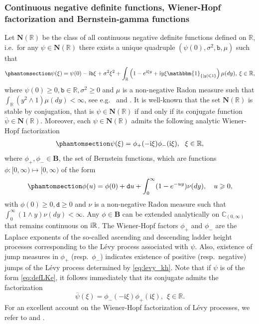 \documentclass[12pt]{amsart}
\newcommand{\hlabel}{\phantomsection\label}
\numberwithin{equation}{section}
\newcommand{\bb}{\mathbb}
\renewcommand{\ge}{\geqslant}
\renewcommand{\le}{\leqslant}
\renewcommand{\geq}{\geqslant}
\renewcommand{\Re}{\textrm{Re}}
\newcommand{\ov}{\overline}
\newcommand{\ttt}{\mathtt}
\newcommand{\B}{\mathbf{B}}
\theoremstyle{definition}
\theoremstyle{assump}
\theoremstyle{remark}
\begin{document}
\subsubsection{Continuous negative definite functions, Wiener-Hopf factorization and Bernstein-gamma functions}
Let $\mathbf{N}(\bb{R})$  be the class of all continuous negative definite functions defined on $\bb{R}$, i.e.~for any $\psi\in\mathbf{N}(\bb{R})$  there exists a unique quadruple  $(\psi(0),\sigma^2,\ttt{b},\mu)$ such that
\begin{align} \hlabel{eq:defLKe}
\psi(\xi)=\psi(0)-\mathrm{i}\ttt{b}\xi+\sigma^2\xi^2+\int_{\bb{R}}\left(1-e^{{\rm{i}}\xi   y}+{\rm{i}}y   \xi\mathbbm{1}_{\{|y|\le 1\}}\right)\mu(dy), \: \xi \in \bb{R},
\end{align}
where $\psi(0)\ge 0, \ttt{b}\in\bb{R},\sigma^2\ge 0$ and $\mu$ is a non-negative Radon measure such that $\int_{\bb{R}}(y^2\wedge 1)\mu(dy)<\infty$, see e.g.~\cite{Jacob} and \cite[Chap.~4]{SchillingSongVondracek10}. It is  well-known that the set $\mathbf{N}(\bb{R})$ is stable by conjugation, that is  $\psi\in\mathbf{N}(\bb{R})$ if and only if its conjugate function $\ov{\psi}\in \mathbf{N}(\bb{R})$. Moreover,  each $\psi\in\mathbf{N}(\bb{R})$ admits  the following analytic Wiener-Hopf factorization
\begin{align} \hlabel{eq:WH}
\psi(\xi)=\phi_+(-{\rm{i}}\xi  )\phi_-({\rm{i}}\xi  ), \ \ \xi\in\bb{R},
\end{align}
where $\phi_+, \phi_-\in\B$,  the set of Bernstein functions,  which are functions $\phi :[0,\infty) \mapsto [0,\infty)$  of the form
\begin{align}\hlabel{eq:phi_def}
\phi(u)=\phi(0)+\ttt{d}u+\int_0^\infty (1-e^{-uy})\nu(dy), \ \ \ u\geq0,
\end{align}
with $\phi(0)\ge 0, \ttt{d}\ge 0$ and $\nu$ is a non-negative Radon measure such that $\int_0^\infty (1\wedge y) \nu(dy)<\infty.$  Any $\phi\in\B$ can be extended analytically on $\bb{C}_{(0,\infty)}$ that remains continuous on ${\rm{i}}\bb{R}$.
The Wiener-Hopf factors $\phi_+$ and $\phi_-$ are the Laplace exponents of the so-called ascending and descending ladder height processes corresponding to the L\'evy process associated with $\psi$. Also, existence of jump measures in $\phi_+$ (resp.~$\phi_-$) indicates existence of positive (resp.~negative) jumps of the L\'evy process determined by \eqref{eq:levy_kh}.
Note that if $\psi$ is of the form \eqref{eq:defLKe}, it follows immediately that its conjugate admits the factorization \[ \ov{\psi}(\xi)=\phi_-(-\mathrm{i}\xi)\phi_+(\mathrm{i}\xi), \ \ \xi\in\bb{R}. \]
 For an excellent account  on the Wiener-Hopf factorization of L\'evy processes, we refer to   \cite[Chapter VI]{bertoin1996levy} and  \cite[Chapter 6]{kyprianou2014fluctuations}.
\end{document}
